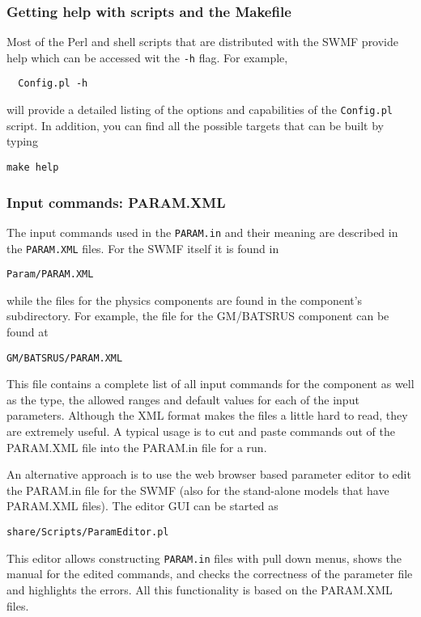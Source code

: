 \subsubsection{Getting help with scripts and the Makefile}

Most of the Perl and shell scripts that are distributed with the SWMF
provide help which can be accessed wit the {\tt -h} flag. For example, 
\begin{verbatim}
  Config.pl -h
\end{verbatim}
will provide a detailed listing of the options and capabilities of the
{\tt Config.pl} script.  In addition, you can find all the possible
targets  that can be built by typing
\begin{verbatim}
make help
\end{verbatim}

\subsubsection{Input commands: PARAM.XML}

The input commands used in the {\tt PARAM.in} and their meaning are 
described in the {\tt PARAM.XML} files. For the SWMF itself it is found in
\begin{verbatim}
Param/PARAM.XML
\end{verbatim}
while the files for the physics components are found in the component's
subdirectory.  For example, the file for the GM/BATSRUS component can
be found at
\begin{verbatim}
GM/BATSRUS/PARAM.XML
\end{verbatim}
This file contains a complete list of all input commands for the
component as well as the type, the allowed ranges and default values
for each of the input parameters.
Although the XML format makes the files a little hard to read, they are
extremely useful.  A typical usage is to cut and paste commands out of the
PARAM.XML file into the PARAM.in file for a run. 

An alternative approach is to use the web browser based parameter editor 
to edit the PARAM.in file for the SWMF 
(also for the stand-alone models that have PARAM.XML files).
The editor GUI can be started as
\begin{verbatim}
share/Scripts/ParamEditor.pl
\end{verbatim}
This editor allows constructing {\tt PARAM.in} files with pull down menus, 
shows the manual for the edited commands, and checks the correctness of
the parameter file and highlights the errors. All this functionality 
is based on the PARAM.XML files.

